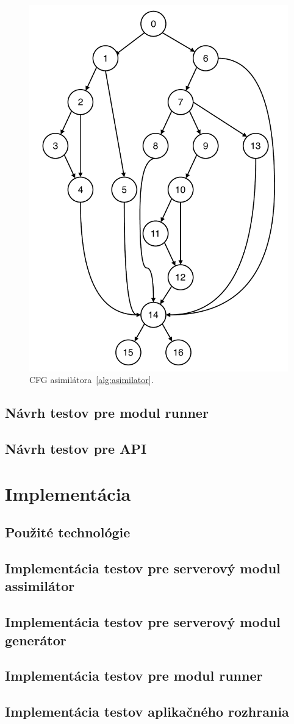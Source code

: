 \begin{figure}[h]
	\centering
	\includegraphics[height=0.7\paperheight]{obrazky/cfg_asimilator.pdf}
	\caption{CFG asimilátora~\ref{alg:asimilator}.}
	\label{fig:cfg_asim}
\end{figure}
\section{Návrh testov pre modul runner}

\section{Návrh testov pre API}

\chapter{Implementácia}
\section{Použité technológie}
\section{Implementácia testov pre serverový modul assimilátor}
\section{Implementácia testov pre serverový modul generátor}
\section{Implementácia testov pre modul runner}
\section{Implementácia testov aplikačného rozhrania }
